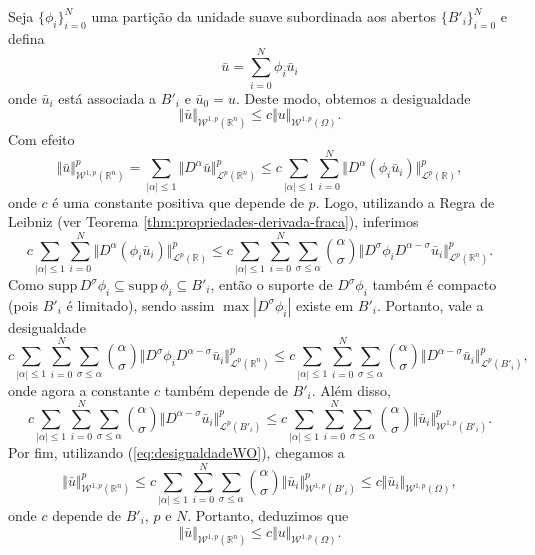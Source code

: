 \documentclass[a4paper, 11pt]{book}
\theoremstyle{definition}
\newcommand{\bR}{\mathbb{R}}
\newcommand{\cL}{\mathcal{L}}
\newcommand{\cW}{\mathcal{W}}
\newcommand{\supp}{\mathrm{supp}\,}
\begin{document}
\begin{prf}
    Seja $\{\phi_i\}_{i=0}^N$ uma partição da unidade suave subordinada aos abertos $\{B'_i\}_{i=0}^N$ e defina
    \[
        \bar u = \sum_{i=0}^N \phi_i \bar u_i
    \]
    onde $\bar u_i$ está associada a $B'_i$ e $\bar u_0 = u$. Deste modo, obtemos a desigualdade
    \[
        \Vert \bar u \Vert_{\cW^{1,p}(\bR^n)} \leqslant c \Vert u \Vert_{\cW^{1,p}(\Omega)}.
    \]
    Com efeito
    \[
        \Vert \bar u \Vert^p_{\cW^{1,p}(\bR^n)} = \sum_{|\alpha| \leqslant 1} \Vert D^\alpha \bar u \Vert^p_{\cL^p(\bR^n)}
        \leqslant c\sum_{|\alpha| \leqslant 1} \sum_{i=0}^N \Vert D^\alpha (\phi_i \bar u_i) \Vert_{\cL^p(\bR)}^p,
    \]
    onde $c$ é uma constante positiva que depende de $p$. Logo, utilizando a Regra de Leibniz (ver Teorema \ref{thm:propriedades-derivada-fraca}), inferimos
    \[
        c\sum_{|\alpha| \leqslant 1} \sum_{i=0}^N \Vert D^\alpha (\phi_i \bar u_i) \Vert_{\cL^p(\bR)}^p \leqslant c\sum_{|\alpha| \leqslant 1} \sum_{i=0}^{N} \sum_{\sigma \leqslant \alpha} \binom{\alpha}{\sigma} \Vert D^\sigma \phi_i D^{\alpha - \sigma} \bar u_i \Vert_{\cL^p(\bR^n)}^p.
    \]
    Como $\supp D^\sigma \phi_i \subseteq \supp \phi_i \subseteq B'_i$, então o suporte de $D^\sigma \phi_i$ também é compacto (pois $B'_i$ é limitado), sendo assim $\max |D^\sigma \phi_i|$ existe em $B'_i$.
    Portanto, vale a desigualdade
    \[
        c\sum_{|\alpha| \leqslant 1} \sum_{i=0}^{N} \sum_{\sigma \leqslant \alpha} \binom{\alpha}{\sigma} \Vert D^\sigma \phi_i D^{\alpha - \sigma} \bar u_i \Vert_{\cL^p(\bR^n)}^p \leqslant c\sum_{|\alpha| \leqslant 1} \sum_{i=0}^{N} \sum_{\sigma \leqslant \alpha} \binom{\alpha}{\sigma} \Vert D^{\alpha - \sigma} \bar u_i \Vert_{\cL^p(B'_i)}^p,
    \]
    onde agora a constante $c$ também depende de $B'_i$. Além disso,
    \[
        c\sum_{|\alpha| \leqslant 1} \sum_{i=0}^{N} \sum_{\sigma \leqslant \alpha} \binom{\alpha}{\sigma} \Vert D^{\alpha - \sigma} \bar u_i \Vert_{\cL^p(B'_i)}^p \leqslant c\sum_{|\alpha| \leqslant 1} \sum_{i=0}^{N} \sum_{\sigma \leqslant \alpha} \binom{\alpha}{\sigma} \Vert \bar u_i \Vert_{\cW^{1,p}(B'_i)}^p.
    \]
    Por fim, utilizando (\ref{eq:desigualdadeWO}), chegamos a
    \[
         \Vert \bar u \Vert^p_{\cW^{1,p}(\bR^n)} \leqslant c\sum_{|\alpha| \leqslant 1} \sum_{i=0}^{N} \sum_{\sigma \leqslant \alpha} \binom{\alpha}{\sigma} \Vert \bar u_i \Vert_{\cW^{1,p}(B'_i)}^p \leqslant c\Vert \bar u_i \Vert_{\cW^{1,p}(\Omega)},
    \]
    onde $c$ depende de $B'_i$, $p$ e $N$.
    Portanto, deduzimos que
    \begin{equation} \label{eq:Mm}
        \Vert \bar u \Vert_{\cW^{1,p}(\bR^n)} \leqslant c \Vert u \Vert_{\cW^{1,p}(\Omega)}.
    \end{equation}


\end{prf}
\end{document}
